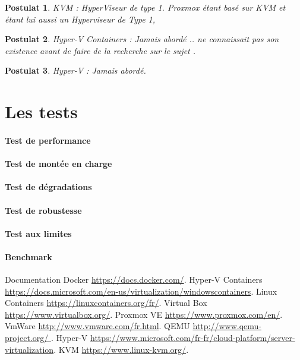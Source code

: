 \documentclass[french]{article}
\newtheorem{post}{Postulat}
\begin{document}
\begin{post}
KVM : HyperViseur de type 1. Proxmox étant basé sur KVM et étant lui aussi un Hyperviseur de Type 1, 
\end{post}

\begin{post}
Hyper-V Containers : Jamais abordé .. ne connaissait pas son existence avant de faire de la recherche sur le sujet .
\end{post}

\begin{post}
Hyper-V : Jamais abordé.
\end{post}


\section{Les tests}
\paragraph{Test de performance}
\paragraph{Test de montée en charge}
\paragraph{Test de dégradations}
\paragraph{Test de robustesse}
\paragraph{Test aux limites}
\paragraph{Benchmark}
\newpage
\begin{thebibliography}{9}

          Documentation Docker
          \url{https://docs.docker.com/}.
          Hyper-V Containers
          \url{https://docs.microsoft.com/en-us/virtualization/windowscontainers}.
         Linux Containers
         \url{https://linuxcontainers.org/fr/}.
         Virtual Box
         \url{ https://www.virtualbox.org/}.
         Proxmox VE
         \url{https://www.proxmox.com/en/}.
         VmWare
         \url{ http://www.vmware.com/fr.html}.
         QEMU
         \url{http://www.qemu-project.org/   }.
         Hyper-V
         \url{https://www.microsoft.com/fr-fr/cloud-platform/server-virtualization}.      
         KVM
         \url{https://www.linux-kvm.org/}.

\end{thebibliography}
\end{document}
